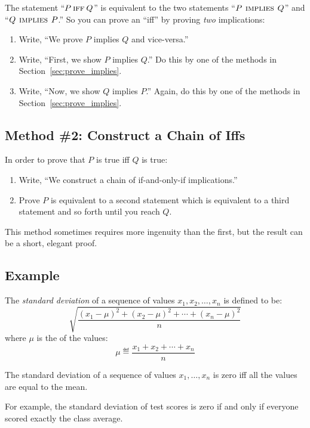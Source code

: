 The statement ``$P \mathbin{\mathrm{\textsc{iff}}} Q$'' is equivalent to the two statements ``$P
\mathbin{\mathrm{\textsc{\,implies\,}}} Q$'' and ``$Q \mathbin{\mathrm{\textsc{\,implies\,}}} P$.''  So you can prove an ``iff'' by
proving \textit{two} implications:
%
\begin{enumerate}
\item Write, ``We prove $P$ implies $Q$ and vice-versa.''
\item Write, ``First, we show $P$ implies $Q$.'' Do this by one
of the methods in Section~\ref{sec:prove_implies}.
\item Write, ``Now, we show $Q$ implies $P$.''  Again, do this by
one of the methods in Section~\ref{sec:prove_implies}.
\end{enumerate}

\subsection{Method \#2:  Construct a Chain of Iffs}
In order to prove that $P$ is true iff $Q$ is true:
%
\begin{enumerate}
\item Write, ``We construct a chain of if-and-only-if implications.''
\item Prove $P$ is equivalent to a second statement which is
equivalent to a third statement and so forth until you reach $Q$.
\end{enumerate}
%
This method sometimes requires more ingenuity than the first, but the
result can be a short, elegant proof.

\subsection*{Example}
The \textit{standard deviation} of a sequence of values $x_1, x_2,
\dots, x_n$ is defined to be:
%
\begin{equation}\label{sd}
\sqrt{\frac{(x_1 - \mu)^2 + (x_2 - \mu)^2 + \cdots + (x_n - \mu)^2}{n}}
\end{equation}
%
where $\mu$ is the  of the values:
%
\[
\mu \eqdef \frac{x_1 + x_2 + \cdots + x_n}{n}
\]

\begin{theorem}
The standard deviation of a sequence of values $x_1, \dots, x_n$ is
zero iff all the values are equal to the mean.
\end{theorem}

For example, the standard deviation of test scores is zero if and only
if everyone scored exactly the class average.

